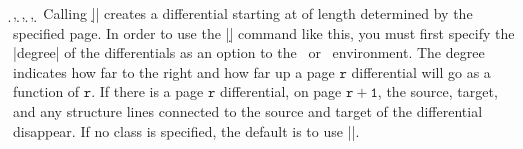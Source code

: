 \begin{sseqdata}[name = basic, cohomological Serre grading]
\begin{commandlist}{
    {\d\ooptions{}},
    {\d\ooptions{}},
    {\d\ooptions{}\pars{\sourcename\opt{,\targetn}}},
    {\d\ooptions{}\pars{\sourcecoord}\pars{\targetcoord}}%
}%
Calling |\d{}| creates a differential starting at
 of length determined by the specified page. In order to use the
|\d| command like this, you must first specify the |degree| of the differentials
as an option to the \sseqdataenv\  or \sseqpageenv\  environment. The degree
indicates how far to the right and how far up a page $\mathtt{r}$ differential
will go as a function of $\mathtt{r}$. If there is a page $\mathtt{r}$
differential, on page $\mathtt{r+1}$, the source, target, and any structure
lines connected to the source and target of the differential disappear. If no
class is specified, the default is to use |\lastclass|.


\end{commandlist}
\end{sseqdata}
